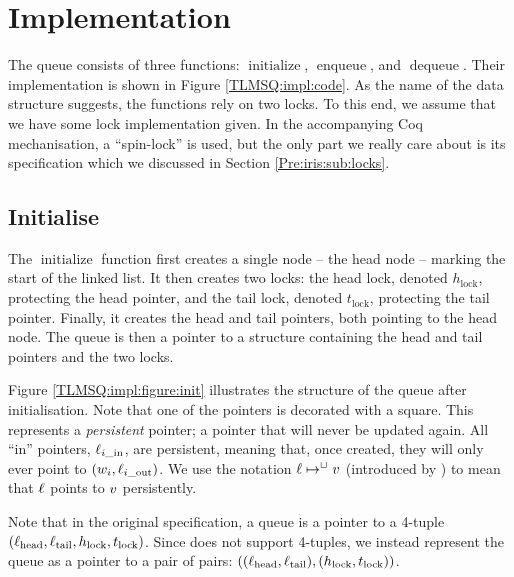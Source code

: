 \documentclass[a4paper, 10pt]{report}
\theoremstyle{definition}
\newcommand{\initialise}{\operatorname{initialize}}
\newcommand{\enqueue}{\operatorname{enqueue}}
\newcommand{\dequeue}{\operatorname{dequeue}}
\newcommand{\locinM}[1]{\loc_{#1\_\mathrm{in}}}
\newcommand{\locoutM}[1]{\loc_{#1\_\mathrm{out}}}
\newcommand{\locN}[1]{\loc_{\mathrm{#1}}}
\newcommand{\lochead}{\locN{head}}
\newcommand{\loctail}{\locN{tail}}
\newcommand{\nodeval}{\valB}
\newcommand{\nodevalM}[1]{\nodeval_{#1}}
\newcommand{\Hlock}{h_{\mathrm{lock}}}
\newcommand{\Tlock}{t_{\mathrm{lock}}}
\begin{document}
\section{Implementation}
\label{TLMSQ:section:implementation}

The queue consists of three functions: $\initialise$, $\enqueue$, and $\dequeue$. Their implementation is shown in Figure \ref{TLMSQ:impl:code}. As the name of the data structure suggests, the functions rely on two locks. To this end, we assume that we have some lock implementation given. In the accompanying Coq mechanisation, a ``spin-lock'' is used, but the only part we really care about is its specification which we discussed in Section \ref{Pre:iris:sub:locks}.

\subsection{Initialise}
\label{TLMSQ:implementation:sub:initialise}

The $\initialise$ function first creates a single node -- the head node -- marking the start of the linked list. It then creates two locks: the head lock, denoted $\Hlock$, protecting the head pointer, and the tail lock, denoted $\Tlock$, protecting the tail pointer. Finally, it creates the head and tail pointers, both pointing to the head node. The queue is then a pointer to a structure containing the head and tail pointers and the two locks.

Figure \ref{TLMSQ:impl:figure:init} illustrates the structure of the queue after initialisation. Note that one of the pointers is decorated with a square. This represents a \emph{persistent} pointer; a pointer that will never be updated again. All ``in'' pointers, $\locinM{i}$, are persistent, meaning that, once created, they will only ever point to $(\nodevalM{i}, \locoutM{i})$. We use the notation $\ell \mapsto^{\mathop{\Box}} v$ (introduced by \citet{DBLP:conf/cpp/VindumB21}) to mean that $\ell$ points to $v$ persistently.

Note that in the original specification, a queue is a pointer to a 4-tuple $(\lochead, \loctail, \Hlock, \Tlock)$. Since \heaplang does not support 4-tuples, we instead represent the queue as a pointer to a pair of pairs: $\left((\lochead, \loctail), (\Hlock, \Tlock)\right)$.
\end{document}
